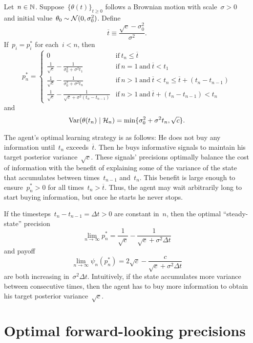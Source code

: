 \documentclass[11pt,oneside]{article}
\begin{document}
\begin{proposition}
    \label{prop:solution-brownian}
    Let~$n\in\mathbb{N}$.
    Suppose~$\{\theta(t)\}_{t\ge0}$ follows a Brownian motion with scale~$\sigma>0$ and initial value~$\theta_0\sim\mathcal{N}(0,\sigma_0^2)$.
    Define
    \[ \overline{t}\equiv\frac{\sqrt{c}-\sigma_0^2}{\sigma^2}. \]
    If~$p_i=p_i^*$ for each~$i<n$, then
    \begin{equation}
        p_n^*=\begin{cases}
            0 & \text{if}\ t_n\le\overline{t} \\
            \frac{1}{\sqrt{c}}-\frac{1}{\sigma_0^2+\sigma^2t_1} & \text{if}\ n=1\ \text{and}\ \overline{t}<t_1 \\
            \frac{1}{\sqrt{c}}-\frac{1}{\sigma_0^2+\sigma^2t_n} & \text{if}\ n>1\ \text{and}\ \overline{t}<t_n\le\overline{t}+(t_n-t_{n-1}) \\
            \frac{1}{\sqrt{c}}-\frac{1}{\sqrt{c}+\sigma^2(t_n-t_{n-1})} & \text{if}\ n>1\ \text{and}\ \overline{t}+(t_n-t_{n-1})<t_n
        \end{cases}
    \end{equation}
    and
    \[ \operatorname{Var}(\theta(t_n)\mid\mathcal{H}_n)=\min\{\sigma_0^2+\sigma^2t_n,\sqrt{c}\}. \]
\end{proposition}
%

The agent's optimal learning strategy is as follows:
He does not buy any information until~$t_n$ exceeds~$\overline{t}$.
Then he buys informative signals to maintain his target posterior variance~$\sqrt{c}$.
These signals' precisions optimally balance the cost of information with the benefit of explaining some of the variance of the state that accumulates between times~$t_{n-1}$ and~$t_n$.
This benefit is large enough to ensure~$p_n^*>0$ for all times~$t_n>\overline{t}$.
Thus, the agent may wait arbitrarily long to start buying information, but once he starts he never stops.

If the timesteps~$t_n-t_{n-1}=\Delta t>0$ are constant in~$n$, then the optimal ``steady-state'' precision
\[ \lim_{n\to\infty}p_n^*=\frac{1}{\sqrt{c}}-\frac{1}{\sqrt{c}+\sigma^2\Delta t} \]
and payoff
\[ \lim_{n\to\infty}\psi_n(p_n^*)=2\sqrt{c}-\frac{c}{\sqrt{c}+\sigma^2\Delta t} \]
are both increasing in~$\sigma^2\Delta t$.
Intuitively, if the state accumulates more variance between consecutive times, then the agent has to buy more information to obtain his target posterior variance~$\sqrt{c}$.

\section{Optimal forward-looking precisions}
\label{sec:planning}
\end{document}
